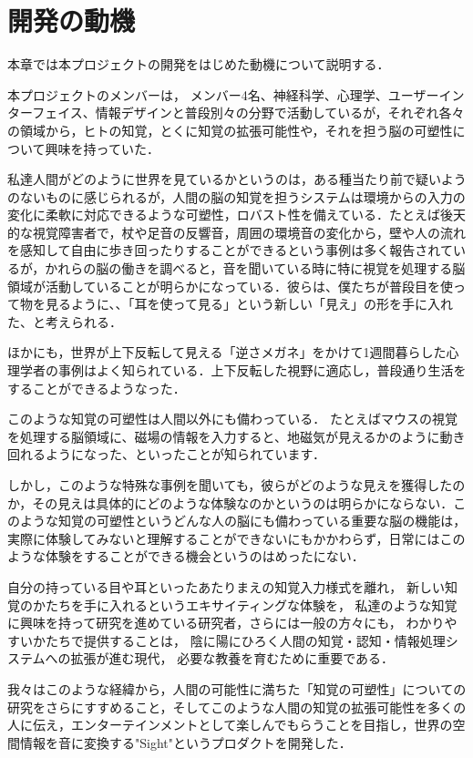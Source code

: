 \section{開発の動機}

本章では本プロジェクトの開発をはじめた動機について説明する．

本プロジェクトのメンバーは，
メンバー4名、神経科学、心理学、ユーザーインターフェイス、情報デザインと普段別々の分野で活動しているが，それぞれ各々の領域から，ヒトの知覚，とくに知覚の拡張可能性や，それを担う脳の可塑性について興味を持っていた．

私達人間がどのように世界を見ているかというのは，ある種当たり前で疑いようのないものに感じられるが，人間の脳の知覚を担うシステムは環境からの入力の変化に柔軟に対応できるような可塑性，ロバスト性を備えている．たとえば後天的な視覚障害者で，杖や足音の反響音，周囲の環境音の変化から，壁や人の流れを感知して自由に歩き回ったりすることができるという事例は多く報告されているが，かれらの脳の働きを調べると，音を聞いている時に特に視覚を処理する脳領域が活動していることが明らかになっている．彼らは、僕たちが普段目を使って物を見るように、、「耳を使って見る」という新しい「見え」の形を手に入れた、と考えられる．

ほかにも，世界が上下反転して見える「逆さメガネ」をかけて1週間暮らした心理学者の事例はよく知られている．上下反転した視野に適応し，普段通り生活をすることができるようなった．

このような知覚の可塑性は人間以外にも備わっている．
たとえばマウスの視覚を処理する脳領域に、磁場の情報を入力すると、地磁気が見えるかのように動き回れるようになった、といったことが知られています．

しかし，このような特殊な事例を聞いても，彼らがどのような見えを獲得したのか，その見えは具体的にどのような体験なのかというのは明らかにならない．このような知覚の可塑性というどんな人の脳にも備わっている重要な脳の機能は，実際に体験してみないと理解することができないにもかかわらず，日常にはこのような体験をすることができる機会というのはめったにない．

自分の持っている目や耳といったあたりまえの知覚入力様式を離れ，
新しい知覚のかたちを手に入れるというエキサイティングな体験を，
私達のような知覚に興味を持って研究を進めている研究者，さらには一般の方々にも，
わかりやすいかたちで提供することは，
陰に陽にひろく人間の知覚・認知・情報処理システムへの拡張が進む現代，
必要な教養を育むために重要である．

我々はこのような経緯から，人間の可能性に満ちた「知覚の可塑性」についての研究をさらにすすめること，そしてこのような人間の知覚の拡張可能性を多くの人に伝え，エンターテインメントとして楽しんでもらうことを目指し，世界の空間情報を音に変換する"Sight"というプロダクトを開発した．

